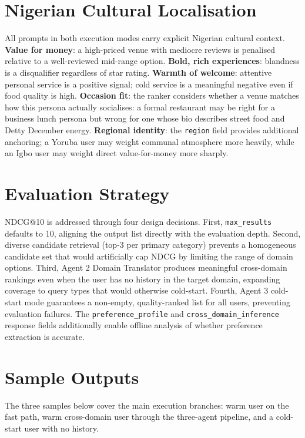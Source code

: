 \documentclass[11pt]{article}
\begin{document}
\section{Nigerian Cultural Localisation}

All prompts in both execution modes carry explicit Nigerian cultural context. \textbf{Value for money}: a high-priced venue with mediocre reviews is penalised relative to a well-reviewed mid-range option. \textbf{Bold, rich experiences}: blandness is a disqualifier regardless of star rating. \textbf{Warmth of welcome}: attentive personal service is a positive signal; cold service is a meaningful negative even if food quality is high. \textbf{Occasion fit}: the ranker considers whether a venue matches how this persona actually socialises: a formal restaurant may be right for a business lunch persona but wrong for one whose bio describes street food and Detty December energy. \textbf{Regional identity}: the \texttt{region} field provides additional anchoring; a Yoruba user may weight communal atmosphere more heavily, while an Igbo user may weight direct value-for-money more sharply.

\section{Evaluation Strategy}

NDCG@10 is addressed through four design decisions. First, \texttt{max\_results} defaults to 10, aligning the output list directly with the evaluation depth. Second, diverse candidate retrieval (top-3 per primary category) prevents a homogeneous candidate set that would artificially cap NDCG by limiting the range of domain options. Third, Agent 2 Domain Translator produces meaningful cross-domain rankings even when the user has no history in the target domain, expanding coverage to query types that would otherwise cold-start. Fourth, Agent 3 cold-start mode guarantees a non-empty, quality-ranked list for all users, preventing evaluation failures. The \texttt{preference\_profile} and \texttt{cross\_domain\_inference} response fields additionally enable offline analysis of whether preference extraction is accurate.

\section{Sample Outputs}

The three samples below cover the main execution branches: warm user on the fast path, warm cross-domain user through the three-agent pipeline, and a cold-start user with no history.
\end{document}
